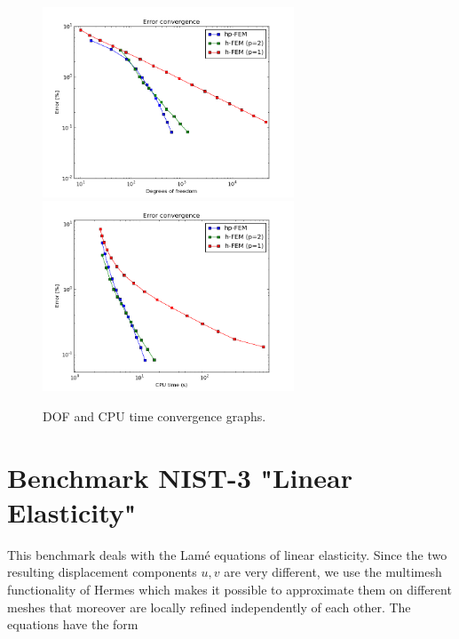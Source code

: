 \documentclass[12pt]{elsarticle}
\begin{document}
\begin{figure}[H]
\centering
\hspace{-50mm}
\includegraphics[width=7.5cm]{nist/nist-2/conv_dof_aniso.png}\ \
\hspace{-10mm}
\includegraphics[width=7.5cm]{nist/nist-2/conv_cpu_aniso.png}
\hspace{-50mm}
\caption{DOF and CPU time convergence graphs.}
\label{fig:nist-2-conv}
\end{figure}


\section{Benchmark NIST-3 "Linear Elasticity"}
\label{sec:bench-3}

This benchmark deals with the Lam\'e equations of linear elasticity.
Since the two resulting displacement components $u, v$ are very different, we use the 
multimesh functionality of Hermes \cite{label2,thermoel} which makes it 
possible to approximate them on different meshes that moreover 
are locally refined independently of each other.
The equations have the form
\end{document}
